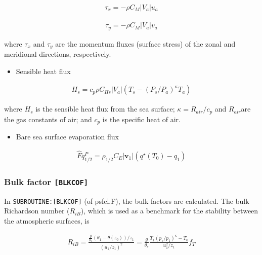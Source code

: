 \begin{eqnarray}
 \tau_x = - \rho C_{M}|V_a| u_a
\end{eqnarray}

\begin{eqnarray}
 \tau_y = - \rho C_{M}|V_a| v_a
\end{eqnarray}

where \(\tau_x\) and \(\tau_y\) are the momentum fluxes (surface stress)
of the zonal and meridional directions, respectively.

\begin{itemize}
\tightlist
\item
  Sensible heat flux
\end{itemize}

\begin{eqnarray}
 H_s = c_p \rho C_{Hs}|V_a| (T_s - (P_s/P_a)^{\kappa}T_a)
\end{eqnarray}

where \(H_s\) is the sensible heat flux from the sea surface;
\(\kappa = R_{air} / c_p\) and \(R_{air}\)are the gas constants of air;
and \(c_p\) is the specific heat of air.

\begin{itemize}
\tightlist
\item
  Bare sea surface evaporation flux
\end{itemize}

\begin{eqnarray}
\hat{F}q^P_{1/2} = \rho_{1/2} C_E |{\mathbf{v}}_1| \left( q^\star(T_0) - q_1 \right)
\end{eqnarray}

\hypertarget{bulk-factor-blkcof}{%
\subsubsection{\texorpdfstring{Bulk factor
\texttt{{[}BLKCOF{]}}}{Bulk factor {[}BLKCOF{]}}}\label{bulk-factor-blkcof}}

In \texttt{SUBROUTINE:{[}BLKCOF{]}} (of psfcl.F), the bulk factors are
calculated. The bulk Richardson number (\(R_{iB}\)), which is used as a
benchmark for the stability between the atmospheric surfaces, is

\begin{eqnarray}
R_{iB} =
            \frac{ \frac{g}{\theta_s} (\theta_1 - \theta(z_0))/z_1 }
              { (u_1/z_1)^2                                  }
       = \frac{g}{\theta_s}
         \frac{T_1 (p_s/p_1)^\kappa - T_0 }{u_1^2/z_1} f_T
\end{eqnarray}

